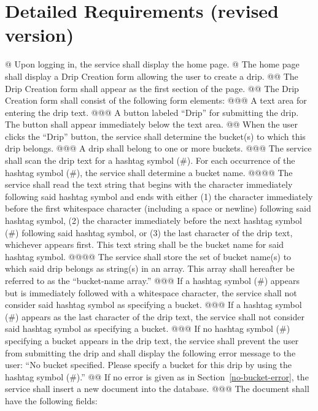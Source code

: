 \documentclass{article}
\begin{document}
\section*{Detailed Requirements (revised version)}

\begin{easylist}[articletoc]
@ Upon logging in, the service shall display the home page.
@ The home page shall display a Drip Creation form allowing the user to create a drip.
@@ The Drip Creation form shall appear as the first section of the page.
@@ The Drip Creation form shall consist of the following form elements:
@@@ A text area for entering the drip text.
@@@ A button labeled ``Drip'' for submitting the drip. The button shall appear immediately below the text area.
@@ \label{submit-drip}When the user clicks the ``Drip'' button, the service shall determine the bucket(s) to which this drip belongs.
@@@ A drip shall belong to one or more buckets.
@@@ The service shall scan the drip text for a hashtag symbol (\#). For each occurrence of the hashtag symbol (\#), the service shall determine a bucket name.
@@@@ The service shall read the text string that begins with the character immediately following said hashtag symbol and ends with either (1) the character immediately before the first whitespace character (including a space or newline) following said hashtag symbol, (2) the character immediately before the next hashtag symbol (\#) following said hashtag symbol, or (3) the last character of the drip text, whichever appears first. This text string shall be the bucket name for said hashtag symbol.
@@@@ \label{bucket-name-array}The service shall store the set of bucket name(s) to which said drip belongs as string(s) in an array. This array shall hereafter be referred to as the ``bucket-name array.''
@@@ If a hashtag symbol (\#) appears but is immediately followed with a whitespace character, the service shall not consider said hashtag symbol as specifying a bucket.
@@@ If a hashtag symbol (\#) appears as the last character of the drip text, the service shall not consider said hashtag symbol as specifying a bucket.
@@@ \label{no-bucket-error}If no hashtag symbol (\#) specifying a bucket appears in the drip text, the service shall prevent the user from submitting the drip and shall display the following error message to the user: ``No bucket specified. Please specify a bucket for this drip by using the hashtag symbol (\#).''
@@ If no error is given as in Section~\ref{no-bucket-error}, the service shall insert a new document into the database.
@@@ \label{field-list}The document shall have the following fields:

\end{easylist}
\end{document}
